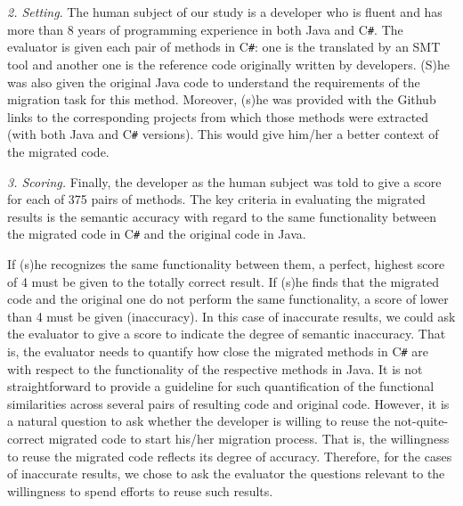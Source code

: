 
\emph{2. Setting}. The human subject of our study is a developer who
is fluent and has more than 8 years of programming experience in both
Java and C\texttt{\#}. The evaluator is given each pair of methods in
C\texttt{\#}: one is the translated by an SMT tool and another one is
the reference code originally written by developers.
%
(S)he was also given the original Java code to understand the
requirements of the migration task for this method. Moreover, (s)he
was provided with the Github links to the corresponding projects from
which those methods were extracted (with both Java and C\texttt{\#}
versions). This would give him/her a better context of the migrated
code.

\emph{3. Scoring.} Finally, the developer as the human subject was
told to give a score for each of 375 pairs of methods. The key
criteria in evaluating the migrated results is the semantic accuracy
with regard to the same functionality between the migrated code in
C\texttt{\#} and the original code in Java. 

If (s)he recognizes the same functionality between them, a perfect,
highest score of 4 must be given to the totally correct result. If
(s)he finds that the migrated code and the original one do not perform
the same functionality, a score of lower than 4 must be given
(inaccuracy). In this case of inaccurate results, we could ask the
evaluator to give a score to indicate the degree of semantic
inaccuracy. That is, the evaluator needs to quantify how close the
migrated methods in C\texttt{\#} are with respect to the functionality
of the respective methods in Java.  It is not straightforward to
provide a guideline for such quantification of the functional
similarities across several pairs of resulting code and original code.
%
However, it is a natural question to ask whether the developer is
willing to reuse the not-quite-correct migrated code to start his/her
migration process. That is, the willingness to reuse the migrated code
reflects its degree of accuracy. Therefore, for the cases of
inaccurate results, we chose to ask the evaluator the questions
relevant to the willingness to spend efforts to reuse such results.

